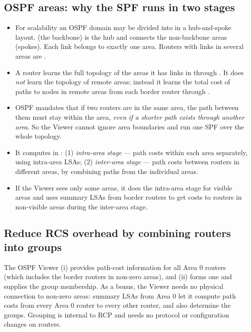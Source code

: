 \subsection{OSPF areas: why the SPF runs in two stages}
\begin{itemize}
\item For scalability an OSPF domain may be divided into  in a hub-and-spoke layout.  (the backbone) is the hub and connects the non-backbone areas (spokes). Each link belongs to exactly one area. Routers with links in several areas are .
\item A router learns the full topology of the areas it has links in through . It does \emph{not} learn the topology of remote areas; instead it learns the total cost of paths to nodes in remote areas from each border router through .
\item OSPF mandates that if two routers are in the same area, the path between them must stay within the area, \emph{even if a shorter path exists through another area}. So the Viewer cannot ignore area boundaries and run one SPF over the whole topology.
\item It computes in : (1) \emph{intra-area stage} --- path costs within each area separately, using intra-area LSAs; (2) \emph{inter-area stage} --- path costs between routers in different areas, by combining paths from the individual areas.
\item If the Viewer sees only some areas, it does the intra-area stage for visible areas and uses summary LSAs from border routers to get costs to routers in non-visible areas during the inter-area stage.
\end{itemize}

\subsection{Reduce RCS overhead by combining routers into groups}
The OSPF Viewer (i) provides path-cost information for all Area 0 routers (which includes the border routers in non-zero areas), and (ii) forms one  and supplies the group membership. As a bonus, the Viewer needs no physical connection to non-zero areas: summary LSAs from Area 0 let it compute path costs from every Area 0 router to every other router, and also determine the groups. Grouping is internal to RCP and needs no protocol or configuration changes on routers.

